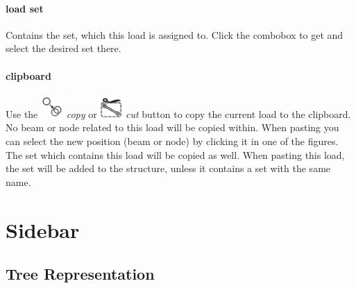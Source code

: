 \documentclass[a4paper,11pt]{report}
\begin{document}
\paragraph{load set} Contains the set, which this load is assigned to. Click the combobox to get and select the desired set there.

\paragraph{clipboard}
Use the \includegraphics[scale=0.5]{../../icons/copy.png} \textit{copy} or \includegraphics[scale=0.5]{../../icons/cut.png} \textit{cut} button to copy the current load to the clipboard. No beam or node related to this load will be copied within. When pasting you can select the new position (beam or node) by clicking it in one of the figures. The set which contains this load will be copied as well. When pasting this load, the set will be added to the structure, unless it contains a set with the same name. 

\section{Sidebar}
\label{sec:sidebar}

\subsection{Tree Representation}
\label{ssec:tree}


\begin{figure}[H]
\label{pic:tree}
\end{figure}
\end{document}

